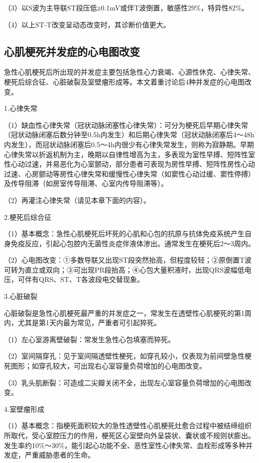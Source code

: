 （3）以S波为主导联ST段压低≥0.1mV或伴T波倒置，敏感性29\%，特异性82\%。

（4）以上ST-T改变呈动态改变时，其诊断价值更大。

\protect\hypertarget{text00052.htmlux5cux23subid630}{}{}

\subsection{心肌梗死并发症的心电图改变}

急性心肌梗死后所出现的并发症主要包括急性心力衰竭、心源性休克、心律失常、梗死后综合征、心脏破裂及室壁瘤形成等。本文着重讨论后4种并发症的心电图改变。

1.心律失常

（1）缺血性心律失常（冠状动脉闭塞性心律失常）：可分为梗死后早期心律失常（冠状动脉闭塞后数分钟至0.5h内发生）和后期心律失常（冠状动脉闭塞后4～48h内发生），而冠状动脉闭塞后0.5～4h内很少有心律失常发生，则称为寂静期。早期心律失常以折返机制为主，晚期以自律性增高为主，多表现为室性早搏、短阵性室性心动过速，并易恶化为心室颤动，部分患者可表现为房性早搏、短阵性房性心动过速、心房颤动等房性心律失常和缓慢性心律失常（如窦性心动过缓、窦性停搏）及传导阻滞（如房室传导阻滞、心室内传导阻滞等）。

（2）再灌注心律失常（请见本章下面的内容）。

2.梗死后综合征

（1）基本概念：急性心肌梗死后坏死的心肌和心包的抗原与抗体免疫系统产生自身免疫反应，引起心包腔内无菌性炎症伴液体渗出。通常发生在梗死后2～3周内。

（2）心电图改变：①多数导联又出现ST段突然抬高，但程度较轻；②原倒置T波可转为直立或双向；③可出现PR段抬高；④心包大量积液时，出现QRS波幅低电压，可伴有QRS、ST、T各波段电交替现象。

3.心脏破裂

心脏破裂是急性心肌梗死最严重的并发症之一，常发生在透壁性心肌梗死的第1周内，尤其是第1天内最为常见，严重者可引起猝死。

（1）左心室游离壁破裂：常发生急性心包填塞而猝死。

（2）室间隔穿孔：见于室间隔透壁性梗死，如穿孔较小，仅表现为前间壁急性梗死图形；如穿孔较大，可出现右心室容量负荷增加的心电图改变。

（3）乳头肌断裂：可造成二尖瓣关闭不全，出现左心室容量负荷增加的心电图改变。

4.室壁瘤形成

（1）基本概念：指梗死面积较大的急性透壁性心肌梗死灶愈合过程中被结缔组织所取代，受心室腔压力的作用，梗死区心室壁向外呈袋状、囊状或不规则状膨出。发生率约10\%～30\%，能引起心功能不全、恶性室性心律失常、血栓形成等多种并发症，严重威胁患者的生命。

